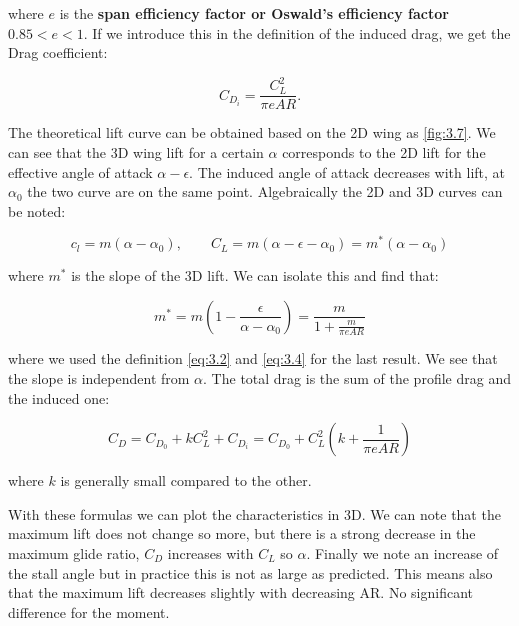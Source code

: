 	where $e$ is the \textbf{span efficiency factor or Oswald's efficiency factor} $0.85<e<1$. If we introduce this in the definition of the induced drag, we get the Drag coefficient:
	
	\begin{equation}
	C_{D_i} =  \frac{C_L^2}{\pi e AR} .
	\end{equation}
	
	The theoretical lift curve can be obtained based on the 2D wing as \autoref{fig:3.7}. We can see that the 3D wing lift for a certain $\alpha$ corresponds to the 2D lift for the effective angle of attack $\alpha - \epsilon$. The induced angle of attack decreases with lift, at $\alpha _0$ the two curve are on the same point. Algebraically the 2D and 3D curves can be noted:
	
	\begin{equation}
	c_l = m(\alpha - \alpha _0), \qquad C_L = m(\alpha - \epsilon - \alpha _0) = m^* (\alpha - \alpha _0)
	\label{eq:3.4}
	\end{equation}
	
	where $m^*$ is the slope of the 3D lift. We can isolate this and find that:
	
	\begin{equation}
	m^* = m\left( 1 - \frac{\epsilon}{\alpha - \alpha _0} \right) = \frac{m}{1+\frac{m}{\pi e AR}} 
	\end{equation}
	
	where we used the definition \eqref{eq:3.2} and \eqref{eq:3.4} for the last result. We see that the slope is independent from $\alpha$. The total drag is the sum of the profile drag and the induced one:
	
	\begin{equation}
	C_D = C_{D_0} + kC_L^2 + C_{D_i} = C_{D_0} + C_L^2 \left( k + \frac{1}{\pi e AR}\right)
\end{equation}	 

	where $k$ is generally small compared to the other. 

	With these formulas we can plot the characteristics in 3D. We can note that the maximum lift does not change so more, but there is a strong decrease in the maximum glide ratio, $C_D$ increases with $C_L$ so $\alpha$. Finally we note an increase of the stall angle but in practice this is not as large as predicted. This means also that the maximum lift decreases slightly with decreasing AR. No significant difference for the moment. 
	
